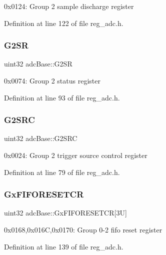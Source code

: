 0x0124\+: Group 2 sample discharge register 

Definition at line 122 of file reg\+\_\+adc.\+h.

\mbox{\label{structadcBase_acdaa0ea6d9e43fee7956a8d5ef57183a}} 
\subsubsection{\texorpdfstring{G2\+SR}{G2SR}}
{\footnotesize\ttfamily uint32 adc\+Base\+::\+G2\+SR}

0x0074\+: Group 2 status register 

Definition at line 93 of file reg\+\_\+adc.\+h.

\mbox{\label{structadcBase_a25041ccf95b86b85f19bf4fc1567d3d4}} 
\subsubsection{\texorpdfstring{G2\+S\+RC}{G2SRC}}
{\footnotesize\ttfamily uint32 adc\+Base\+::\+G2\+S\+RC}

0x0024\+: Group 2 trigger source control register 

Definition at line 79 of file reg\+\_\+adc.\+h.

\mbox{\label{structadcBase_a6ec3d8d0ec7784ac111571c407ba0527}} 
\subsubsection{\texorpdfstring{Gx\+F\+I\+F\+O\+R\+E\+S\+E\+T\+CR}{GxFIFORESETCR}}
{\footnotesize\ttfamily uint32 adc\+Base\+::\+Gx\+F\+I\+F\+O\+R\+E\+S\+E\+T\+CR\mbox{[}3\+U\mbox{]}}

0x0168,0x016C,0x0170\+: Group 0-\/2 fifo reset register 

Definition at line 139 of file reg\+\_\+adc.\+h.

\mbox{\label{structadcBase_a2f6867ee8d242ebee0d811555ac8d485}} 
